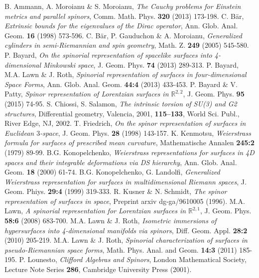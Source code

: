 \documentclass{amsart}
\begin{document}
\begin{thebibliography}{}
 B. Ammann, A. Moroianu \& S. Moroianu, \emph{The Cauchy problems for Einstein metrics and parallel spinors}, Comm. Math. Phys. \textbf{320} (2013) 173-198.
 C. B\"ar, \emph{Extrinsic bounds for the eigenvalues of the Dirac operator}, Ann. Glob. Anal. Geom. \textbf{16}  (1998) 573-596.
 C. B\"ar, P. Gauduchon \& A. Moroianu, \emph{Generalized cylinders in semi-Riemannian and spin geometry}, Math. Z. \textbf{249} (2005) 545-580.
 P. Bayard, \emph{On the spinorial representation of spacelike surfaces into 4-dimensional Minkowski space}, J. Geom. Phys. \textbf{74} (2013) 289-313.
 P. Bayard, M.A. Lawn \& J. Roth, \emph{Spinorial representation of surfaces in four-dimensional Space Forms}, Ann. Glob. Anal. Geom. \textbf{44:4} (2013) 433-453.
 P. Bayard \& V. Patty, \emph{Spinor representation of Lorentzian surfaces in $\mathbb{R}^{2,2}$}, J. Geom. Phys. \textbf{95} (2015) 74-95.
 S. Chiossi, S. Salamon, \emph{The intrinsic torsion of SU(3) and G2 structures}, Differential geometry, Valencia,
2001, \textbf{115--133}, World Sci. Publ., River Edge, NJ, 2002. 
 T. Friedrich, \emph{On the spinor representation of surfaces in Euclidean $3$-space}, J. Geom. Phys. \textbf{28} (1998) 143-157.
 K. Kenmotsu, \emph{Weierstrass formula for surfaces of prescribed mean curvature},
Mathematische Annalen \textbf{245:2} (1979) 89-99.
 B.G. Konopelchenko, \emph{Weierstrass representations for surfaces in 4D spaces and their integrable deformations via DS hierarchy}, Ann. Glob. Anal. Geom. \textbf{18} (2000) 61-74. 
 B.G. Konopelchenko, G. Landolfi, \emph{Generalized Weierstrass representation for surfaces in multidimensional Riemann spaces}, J. Geom. Phiys. \textbf{29:4} (1999) 319-333.
 R. Kusner \& N. Schmidt, \emph{The spinor representation of surfaces in space}, Preprint arxiv dg-ga/9610005 (1996).
 M.A. Lawn, \emph{A spinorial representation for Lorentzian surfaces in ${\mathbb{R}}^{2,1}$}, J. Geom. Phys. \textbf{58:6} (2008) 683-700.
 M.A. Lawn \& J. Roth, \emph{Isometric immersions of hypersurfaces into 4-dimensional manifolds via spinors}, Diff. Geom. Appl. \textbf{28:2} (2010) 205-219.
 M.A. Lawn \& J. Roth, \emph{Spinorial characterization of surfaces in pseudo-Riemannian space forms}, Math. Phys. Anal. and Geom. \textbf{14:3} (2011) 185-195.
 P. Lounesto, \emph{Clifford Algebras and Spinors}, London Mathematical Society, Lecture Note Series \textbf{286}, Cambridge University Press (2001).

\end{thebibliography}
\end{document}
